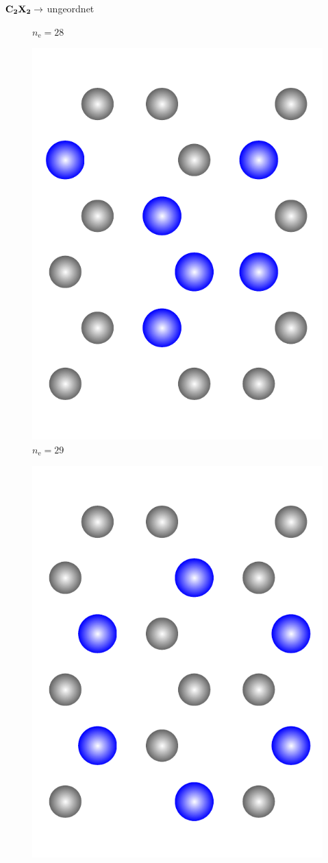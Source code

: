 \documentclass{beamer}
\def \nE {n_\mathrm{e}}
\begin{document}
\begin{frame}{$\bf C_{\boldsymbol 2}X_{\boldsymbol 2} \rightarrow$ ungeordnet}
\begin{figure}
\begin{minipage}[b]{0.19\textwidth}
				$\nE = 28$
			\end{minipage}
			\hfill
			\begin{minipage}[b]{0.19\textwidth}
				\centering
				\includegraphics[height=1.1\textwidth]{Abbildungen/4.pdf} \\
				$\nE = 29$
			\end{minipage}
			\hfill
			\begin{minipage}[b]{0.19\textwidth}
				\centering
				\includegraphics[height=1.1\textwidth]{Abbildungen/5.pdf} \\

\end{minipage}
\end{figure}
\end{frame}
\end{document}
